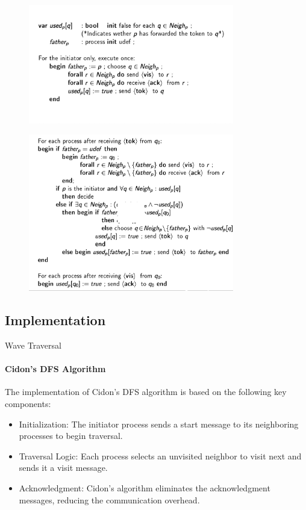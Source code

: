 \documentclass[11pt]{beamer}              %
\begin{document}
\begin{frame}
\begin{figure}
    \centering
    \includegraphics[width=0.8\textwidth]{figures/awerbuch1.jpg}
\end{figure}
\end{frame}

\begin{frame}
\begin{figure}
    \centering
    \includegraphics[width=0.8\textwidth]{figures/awerbuch2.jpg}
\end{figure}
\end{frame}


\subsection{Implementation}
\begin{frame}{Wave Traversal}
\framesubtitle{Cidon's DFS Algorithm}
The implementation of Cidon's DFS algorithm is based on the following key components:
\begin{itemize}
  \item Initialization: The initiator process sends a start message to its neighboring processes to begin traversal.
  \item Traversal Logic: Each process selects an unvisited neighbor to visit next and sends it a visit message.
  \item Acknowledgment: Cidon's algorithm eliminates the acknowledgment messages, reducing the communication overhead.

\end{itemize}

\end{frame}
\end{document}
